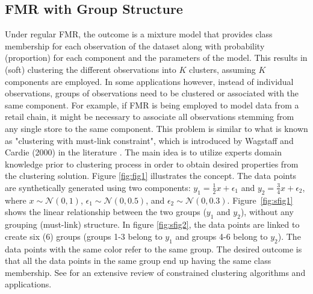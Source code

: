 \documentclass[12pt]{article}
\begin{document}
\subsection{FMR with Group Structure}
Under regular FMR, the outcome is a mixture model that provides class membership for each observation of the dataset along with probability (proportion) for each component and the parameters of the model. This results in (soft) clustering the different observations into $K$ clusters, assuming $K$ components are employed.
In some applications however, instead of individual observations, groups of observations need to be clustered or associated with the same component. For example, if FMR is being employed to model data from a retail chain, it might be necessary to associate all observations stemming from any single store to the same component.
This problem is similar to what is known as "clustering with must-link constraint", which is introduced by Wagstaff and Cardie (2000) in the literature \citep{Wagstaff:2001}. The main idea is to utilize experts domain knowledge prior to clustering process in order to obtain  desired properties from the clustering solution. Figure \ref{fig:fig1} illustrates the concept. The data points are synthetically generated using two components: $y_1 = \frac{1}{2}x+\epsilon_1$ and $ y_2 = \frac{3}{4}x+\epsilon_2$, where $x \sim \mathcal{N}(0,1)$, $\epsilon_1 \sim \mathcal{N}(0,0.5)$, and $\epsilon_2 \sim \mathcal{N}(0,0.3)$. Figure~\ref{fig:sfig1} shows the linear relationship between the two groups ($y_1$ and $y_2$), without any grouping (must-link) structure. In figure \ref{fig:sfig2}, the data points are linked to create six (6) groups (groups 1-3 belong to $y_1$ and groups 4-6 belong to $y_2$). The data points with the same color refer to the same group. The desired outcome is that all the data points in the same group end up having the same class membership. See \cite{basu2009constrained} for an extensive review of constrained clustering algorithms and applications.
\end{document}
